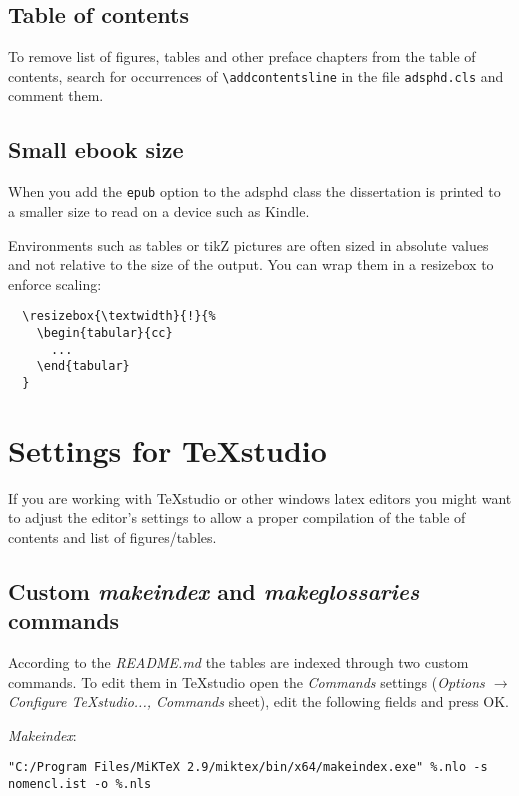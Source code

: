 \subsection{Table of contents}

To remove list of figures, tables and other preface chapters from the table of
contents, search for occurrences of \texttt{\textbackslash addcontentsline} in the file
\texttt{adsphd.cls} and comment them.

\subsection{Small ebook size}

When you add the \texttt{epub} option to the adsphd class the dissertation is
printed to a smaller size to read on a device such as Kindle.

Environments such as tables or tikZ pictures are often sized in absolute values
and not relative to the size of the output. You can wrap them in a resizebox
to enforce scaling:

\begin{verbatim}
  \resizebox{\textwidth}{!}{%
    \begin{tabular}{cc}
      ...
    \end{tabular}
  }
\end{verbatim}

\section{Settings for TeXstudio}

If you are working with TeXstudio or other windows latex editors you might want to adjust the editor's settings to allow a proper compilation of the table of contents and list of figures/tables.

\subsection{Custom \textit{makeindex} and \textit{makeglossaries} commands}

According to the \textit{README.md} the tables are indexed through two custom commands. To edit them in TeXstudio open the \textit{Commands} settings (\textit{Options $\to$ Configure TeXstudio...,  Commands} sheet), edit the following fields and press OK.

\textit{Makeindex}:
{\scriptsize
\begin{verbatim}
"C:/Program Files/MiKTeX 2.9/miktex/bin/x64/makeindex.exe" %.nlo -s nomencl.ist -o %.nls
\end{verbatim}}

